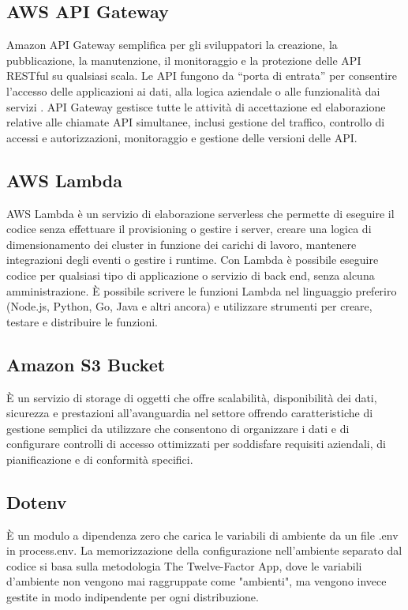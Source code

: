 \subsection{AWS API Gateway}
Amazon API Gateway semplifica per gli sviluppatori la creazione, la pubblicazione, la manutenzione, il monitoraggio e la protezione delle API RESTful su qualsiasi scala. Le API fungono da “porta di entrata” per consentire l’accesso delle applicazioni ai dati, alla logica aziendale o alle funzionalità dai servizi .
API Gateway gestisce tutte le attività di accettazione ed elaborazione relative alle chiamate API simultanee, inclusi gestione del traffico, controllo di accessi e autorizzazioni, monitoraggio e gestione delle versioni delle API.
\subsection{AWS Lambda}
AWS Lambda è un servizio di elaborazione serverless che permette di eseguire il codice senza effettuare il provisioning o gestire i server, creare una logica di dimensionamento dei cluster in funzione dei carichi di lavoro, mantenere integrazioni degli eventi o gestire i runtime.
Con Lambda è possibile eseguire codice per qualsiasi tipo di applicazione o servizio di back end, senza alcuna amministrazione.  È possibile scrivere le funzioni Lambda nel linguaggio preferiro (Node.js, Python, Go, Java e altri ancora) e utilizzare strumenti per creare, testare e distribuire le funzioni.
\subsection{Amazon S3 Bucket}
È un servizio di storage di oggetti che offre scalabilità, disponibilità dei dati, sicurezza e prestazioni all'avanguardia nel settore offrendo caratteristiche di gestione semplici da utilizzare che consentono di organizzare i dati e di configurare controlli di accesso ottimizzati per soddisfare requisiti aziendali, di pianificazione e di conformità specifici.
\subsection{Dotenv}
È un modulo a dipendenza zero che carica le variabili di ambiente da un file .env in process.env. La memorizzazione della configurazione nell'ambiente separato dal codice si basa sulla metodologia The Twelve-Factor App, dove le variabili d'ambiente non vengono mai raggruppate come "ambienti", ma vengono invece gestite in modo indipendente per ogni distribuzione.

